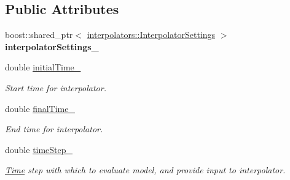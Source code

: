 \subsection*{Public Attributes}
\begin{DoxyCompactItemize}
\item 
boost\+::shared\+\_\+ptr$<$ \hyperlink{classtudat_1_1interpolators_1_1InterpolatorSettings}{interpolators\+::\+Interpolator\+Settings} $>$ {\bfseries interpolator\+Settings\+\_\+}\hypertarget{classtudat_1_1simulation__setup_1_1ModelInterpolationSettings_ac45ee80ab55623b78754fb8dd718ebba}{}\label{classtudat_1_1simulation__setup_1_1ModelInterpolationSettings_ac45ee80ab55623b78754fb8dd718ebba}

\item 
double \hyperlink{classtudat_1_1simulation__setup_1_1ModelInterpolationSettings_a4edb62b7b43adb976b774d5208f66ca2}{initial\+Time\+\_\+}\hypertarget{classtudat_1_1simulation__setup_1_1ModelInterpolationSettings_a4edb62b7b43adb976b774d5208f66ca2}{}\label{classtudat_1_1simulation__setup_1_1ModelInterpolationSettings_a4edb62b7b43adb976b774d5208f66ca2}

\begin{DoxyCompactList}\small\item\em Start time for interpolator. \end{DoxyCompactList}\item 
double \hyperlink{classtudat_1_1simulation__setup_1_1ModelInterpolationSettings_a27100f33bf4e12b01eca3e554c044d9b}{final\+Time\+\_\+}\hypertarget{classtudat_1_1simulation__setup_1_1ModelInterpolationSettings_a27100f33bf4e12b01eca3e554c044d9b}{}\label{classtudat_1_1simulation__setup_1_1ModelInterpolationSettings_a27100f33bf4e12b01eca3e554c044d9b}

\begin{DoxyCompactList}\small\item\em End time for interpolator. \end{DoxyCompactList}\item 
double \hyperlink{classtudat_1_1simulation__setup_1_1ModelInterpolationSettings_a3148abe038357537862c1be22f9ef440}{time\+Step\+\_\+}\hypertarget{classtudat_1_1simulation__setup_1_1ModelInterpolationSettings_a3148abe038357537862c1be22f9ef440}{}\label{classtudat_1_1simulation__setup_1_1ModelInterpolationSettings_a3148abe038357537862c1be22f9ef440}

\begin{DoxyCompactList}\small\item\em \hyperlink{classtudat_1_1Time}{Time} step with which to evaluate model, and provide input to interpolator. \end{DoxyCompactList}\end{DoxyCompactItemize}


